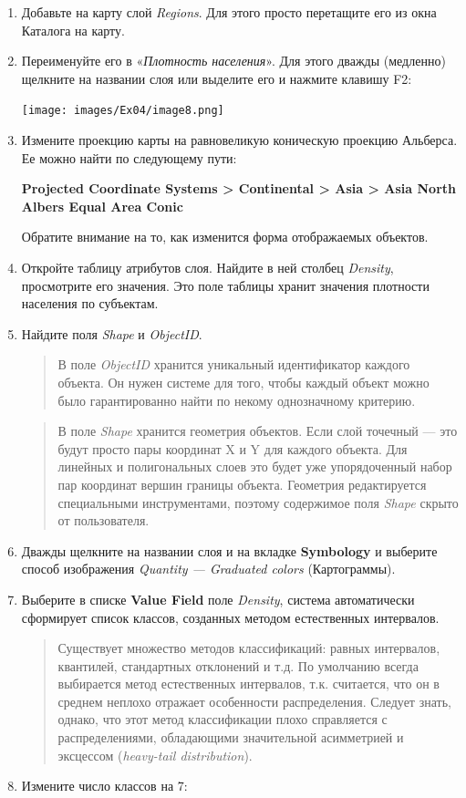 \documentclass[12pt,]{book}
\begin{document}
\begin{enumerate}
\def\labelenumi{\arabic{enumi}.}
\item
  Добавьте на карту слой \emph{Regions}. Для этого просто перетащите его из окна Каталога на карту.
\item
  Переименуйте его в «\emph{Плотность населения}». Для этого дважды (медленно) щелкните на названии слоя или выделите его и нажмите клавишу F2:

  \texttt{[image: images/Ex04/image8.png]}
\item
  Измените проекцию карты на равновеликую коническую проекцию Альберса. Ее можно найти по следующему пути:

  \textbf{Projected Coordinate Systems \textgreater{} Continental \textgreater{} Asia \textgreater{} Asia North Albers Equal Area Conic}

  Обратите внимание на то, как изменится форма отображаемых объектов.
\item
  Откройте таблицу атрибутов слоя. Найдите в ней столбец \emph{Density}, просмотрите его значения. Это поле таблицы хранит значения плотности населения по субъектам.
\item
  Найдите поля \emph{Shape} и \emph{ObjectID}.

  \begin{quote}
  В поле \emph{ObjectID} хранится уникальный идентификатор каждого объекта. Он нужен системе для того, чтобы каждый объект можно было гарантированно найти по некому однозначному критерию.
  \end{quote}

  \begin{quote}
  В поле \emph{Shape} хранится геометрия объектов. Если слой точечный --- это будут просто пары координат X и Y для каждого объекта. Для линейных и полигональных слоев это будет уже упорядоченный набор пар координат вершин границы объекта. Геометрия редактируется специальными инструментами, поэтому содержимое поля \emph{Shape} скрыто от пользователя.
  \end{quote}
\item
  Дважды щелкните на названии слоя и на вкладке \textbf{Symbology} и выберите способ изображения \emph{Quantity --- Graduated colors} (Картограммы).
\item
  Выберите в списке \textbf{Value Field} поле \emph{Density}, система автоматически сформирует список классов, созданных методом естественных интервалов.

  \begin{quote}
  Существует множество методов классификаций: равных интервалов, квантилей, стандартных отклонений и т.д. По умолчанию всегда выбирается метод естественных интервалов, т.к. считается, что он в среднем неплохо отражает особенности распределения. Следует знать, однако, что этот метод классификации плохо справляется с распределениями, обладающими значительной асимметрией и эксцессом (\emph{heavy-tail distribution}).
  \end{quote}
\item
  Измените число классов на 7:


\end{enumerate}
\end{document}
